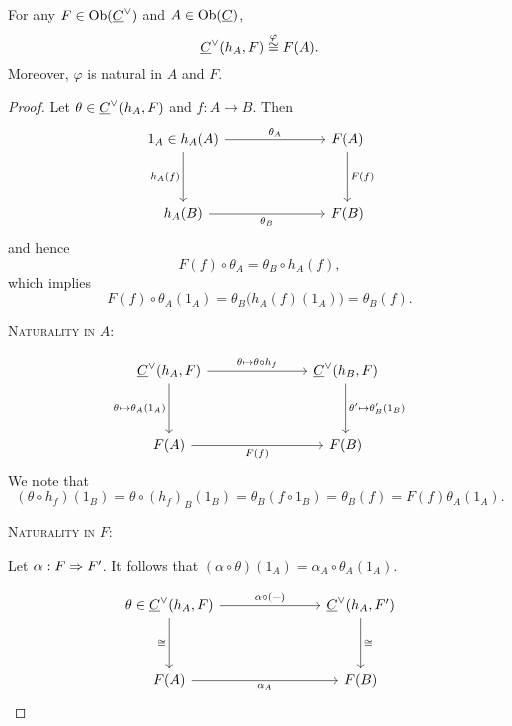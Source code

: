 \begin{lemma*}[Yoneda]
	For any \( F \in \operatorname{Ob}(\underline{C}^\vee) \) and \( A \in \operatorname{Ob}(\underline{C}) \),
	\[
		\underline{C}^\vee(h_A, F) \overset{\varphi}{\cong} F(A).
	\]
	Moreover, \( \varphi \) is natural in \( A \) and \( F \).
\end{lemma*}
\begin{proof}
	Let \( \theta \in \underline{C}^\vee(h_A, F) \) and \( f: A \to B \). Then
	\[
		\begin{tikzcd}{1_A \in h_A(A)} &&& {F(A)} \\
			\\
			{h_A(B)} &&& {F(B)}
			\arrow["{\theta_A}", from=1-1, to=1-4]
			\arrow["{h_A(f)}"', from=1-1, to=3-1]
			\arrow["{F(f)}", from=1-4, to=3-4]
			\arrow["{\theta_B}"', from=3-1, to=3-4]
		\end{tikzcd}
	\]
	and hence
	\[
		F(f) \circ \theta_A = \theta_B \circ h_A(f),
	\]
	which implies
	\[
		F(f) \circ \theta_A(1_A) = \theta_B\bigl(h_A(f)(1_A)\bigr) = \theta_B(f).
	\]

	\newpage

	\textsc{Naturality in \( A \)}:

	\[
		\begin{tikzcd}{\C^\vee(h_A, F)} &&& {\C^\vee(h_B, F)} \\
			\\
			{F(A)} &&& {F(B)}
			\arrow["{\theta \mapsto \theta \circ h_f}", from=1-1, to=1-4]
			\arrow["{\theta \mapsto \theta_A(1_A)}"', from=1-1, to=3-1]
			\arrow["{\theta' \mapsto \theta'_B(1_B)}", from=1-4, to=3-4]
			\arrow["{F(f)}"', from=3-1, to=3-4]
		\end{tikzcd}
	\]
	We note that
	\[
		(\theta \circ h_f)(1_B) = \theta \circ (h_f)_B (1_B) = \theta_B(f \circ 1_B) = \theta_B(f) = F(f) \theta_A(1_A).
	\]

	\textsc{Naturality in \( F \)}:

	\vspace*{3mm}

	Let \( \alpha: F \Rightarrow F' \). It follows that \( (\alpha \circ \theta)(1_A) = \alpha_A \circ \theta_A(1_A) \).

	\[
		\begin{tikzcd}{\theta \in \C^\vee(h_A, F)} &&& {\C^\vee(h_A, F')} \\
			\\
			{F(A)} &&& {F(B)}
			\arrow["{\alpha \circ (-)}", from=1-1, to=1-4]
			\arrow["\cong"', from=1-1, to=3-1]
			\arrow["\cong", from=1-4, to=3-4]
			\arrow["{\alpha_A}"', from=3-1, to=3-4]
		\end{tikzcd}
	\]
\end{proof}


